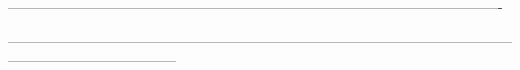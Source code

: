 




----------------------------------------------------------------------------------------------------------



 ------------------------------------------------------------------------------------------------------------------------------------------------

